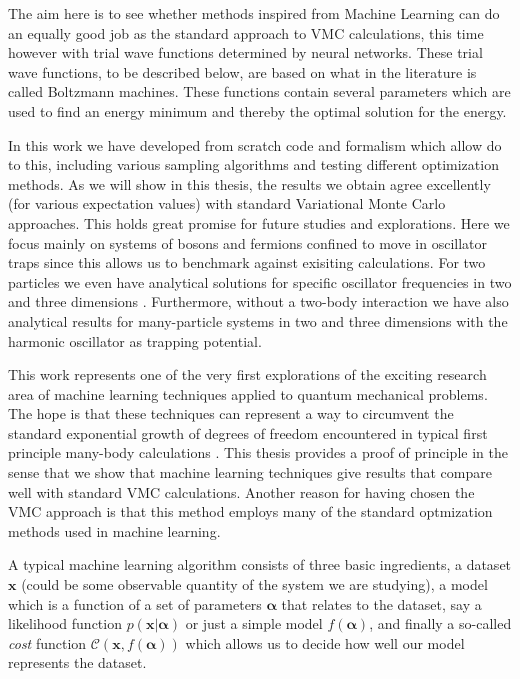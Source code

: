 \documentclass[twoside,english]{uiofysmaster}
\begin{document}
The aim here is to see whether methods inspired from Machine Learning
can do an equally good job as the standard approach to VMC
calculations, this time however with trial wave functions determined
by neural networks.  These trial wave functions, to be described
below, are based on what in the literature is called Boltzmann
machines. These functions contain several parameters which are used to
find an energy minimum and thereby the optimal solution for the
energy.

In this work we have developed from scratch code and formalism which allow
do to this, including various sampling algorithms and testing
different optimization methods. As we will show in this thesis, the
results we obtain agree excellently (for various expectation values)
with standard Variational Monte Carlo approaches. This holds great
promise for future studies and explorations. Here we focus mainly on
systems of bosons and fermions confined to move in oscillator traps
since this allows us to benchmark against exisiting calculations.  For
two particles we even have analytical solutions for specific
oscillator frequencies in two and three dimensions \cite{taut2003,
  taut2004}. Furthermore, without a two-body interaction we have also
analytical results for many-particle systems in two and three
dimensions with the harmonic oscillator as trapping potential.

This work represents one of the very first explorations of the
exciting research area of machine learning techniques applied to
quantum mechanical problems. The hope is that these techniques can
represent a way to circumvent the standard exponential growth of
degrees of freedom encountered in typical first principle many-body
calculations \cite{lnp936}. This thesis provides a proof of principle
in the sense that we show that machine learning techniques give
results that compare well with standard VMC calculations.  Another
reason for having chosen the VMC approach is that this method employs
many of the standard optmization methods used in machine learning.

A typical machine learning algorithm consists of three basic
ingredients, a dataset $\mathbf{x}$ (could be some observable quantity
of the system we are studying), a model which is a function of a set
of parameters $\mathbf{\alpha}$ that relates to the dataset, say a
likelihood function $p(\mathbf{x}\vert \mathbf{\alpha})$ or just a
simple model $f(\mathbf{\alpha})$, and finally a so-called {\em cost}
function $\mathcal{C} (\mathbf{x}, f(\mathbf{\alpha}))$ which allows
us to decide how well our model represents the dataset.
\end{document}

